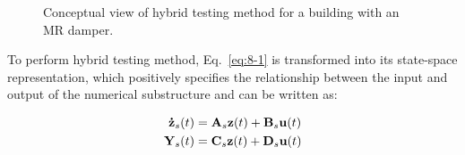 \begin{figure}[!ht]
\centering
{}
\caption{Conceptual view of hybrid testing method for a building with an MR damper.}
\label{fig:8-1}
\end{figure}

To perform hybrid testing method, Eq.~\eqref{eq:8-1} is transformed into its state-space representation, which positively specifies the relationship between the input and output of the numerical substructure and can be written as:

\begin{equation}\label{eq:8-2}
\begin{aligned}
\mathbf{\dot{z}}_{s}(t) &= \mathbf{A}_{s}\mathbf{z}(t) + \mathbf{B}_{s}\mathbf{u}(t)\\
\mathbf{Y}_{s}(t) &=\mathbf{C}_{s}\mathbf{z}(t) + \mathbf{D}_{s}\mathbf{u}(t)
\end{aligned}
\end{equation}

